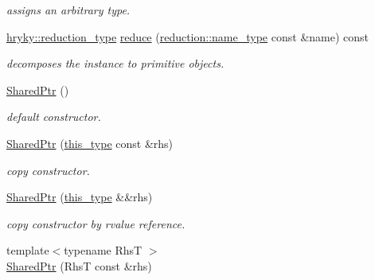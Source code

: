 \begin{DoxyCompactItemize}
\begin{DoxyCompactList}\small\item\em assigns an arbitrary type. \end{DoxyCompactList}\item 
\hypertarget{classhryky_1_1_shared_ptr_a27d2068eec13586b1998d337eceffbad}{\hyperlink{namespacehryky_a343a9a4c36a586be5c2693156200eadc}{hryky\-::reduction\-\_\-type} \hyperlink{classhryky_1_1_shared_ptr_a27d2068eec13586b1998d337eceffbad}{reduce} (\hyperlink{namespacehryky_1_1reduction_ac686c30a4c8d196bbd0f05629a6b921f}{reduction\-::name\-\_\-type} const \&name) const }\label{classhryky_1_1_shared_ptr_a27d2068eec13586b1998d337eceffbad}

\begin{DoxyCompactList}\small\item\em decomposes the instance to primitive objects. \end{DoxyCompactList}\item 
\hypertarget{classhryky_1_1_shared_ptr_ae0b292aca6b803da2a8333be15775852}{\hyperlink{classhryky_1_1_shared_ptr_ae0b292aca6b803da2a8333be15775852}{Shared\-Ptr} ()}\label{classhryky_1_1_shared_ptr_ae0b292aca6b803da2a8333be15775852}

\begin{DoxyCompactList}\small\item\em default constructor. \end{DoxyCompactList}\item 
\hypertarget{classhryky_1_1_shared_ptr_aeb55aedc7398bb3989a9b7293688721e}{\hyperlink{classhryky_1_1_shared_ptr_aeb55aedc7398bb3989a9b7293688721e}{Shared\-Ptr} (\hyperlink{classhryky_1_1_shared_ptr_a0fa551b79990485506c88137044ec4b8}{this\-\_\-type} const \&rhs)}\label{classhryky_1_1_shared_ptr_aeb55aedc7398bb3989a9b7293688721e}

\begin{DoxyCompactList}\small\item\em copy constructor. \end{DoxyCompactList}\item 
\hypertarget{classhryky_1_1_shared_ptr_a3e14d3aa2f8ff15fa3e7d6ef58339dd4}{\hyperlink{classhryky_1_1_shared_ptr_a3e14d3aa2f8ff15fa3e7d6ef58339dd4}{Shared\-Ptr} (\hyperlink{classhryky_1_1_shared_ptr_a0fa551b79990485506c88137044ec4b8}{this\-\_\-type} \&\&rhs)}\label{classhryky_1_1_shared_ptr_a3e14d3aa2f8ff15fa3e7d6ef58339dd4}

\begin{DoxyCompactList}\small\item\em copy constructor by rvalue reference. \end{DoxyCompactList}\item 
\hypertarget{classhryky_1_1_shared_ptr_adc02319bdbd429f83307290b3ab4a298}{{\footnotesize template$<$typename Rhs\-T $>$ }\\\hyperlink{classhryky_1_1_shared_ptr_adc02319bdbd429f83307290b3ab4a298}{Shared\-Ptr} (Rhs\-T const \&rhs)}\label{classhryky_1_1_shared_ptr_adc02319bdbd429f83307290b3ab4a298}


\end{DoxyCompactItemize}
